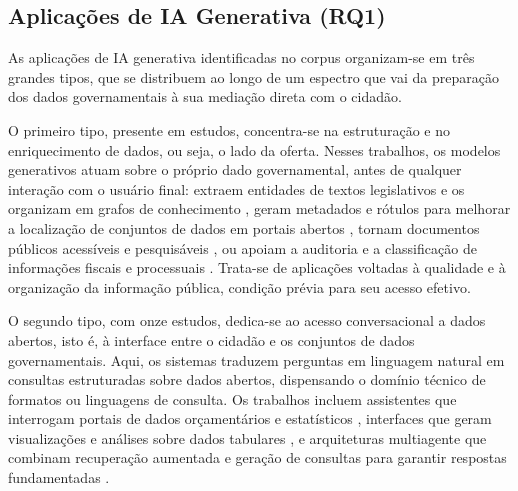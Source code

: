 \subsection{Aplicações de IA Generativa (RQ1)}
\label{subsec:rq1}

As aplicações de IA generativa identificadas no corpus organizam-se em três grandes tipos, que se distribuem ao longo de um espectro que vai da preparação dos dados governamentais à sua mediação direta com o cidadão.

O primeiro tipo, presente em  estudos, concentra-se na estruturação e no enriquecimento de dados, ou seja, o lado da oferta. Nesses trabalhos, os modelos generativos atuam sobre o próprio dado governamental, antes de qualquer interação com o usuário final: extraem entidades de textos legislativos e os organizam em grafos de conhecimento \citep{Colombo2025,Colombo2024}, geram metadados e rótulos para melhorar a localização de conjuntos de dados em portais abertos \citep{TAGIFY2025,Gan2026,GarciaMontero2026}, tornam documentos públicos acessíveis e pesquisáveis \citep{MakingPDFsAccessible2023}, ou apoiam a auditoria e a classificação de informações fiscais e processuais \citep{Monsalvo2025,Baron2023}\ifhl\mbox{\colorbox{yellow}{\citep{Fang2023}}}\else\citep{Fang2023}\fi. Trata-se de aplicações voltadas à qualidade e à organização da informação pública, condição prévia para seu acesso efetivo.

O segundo tipo, com onze estudos, dedica-se ao acesso conversacional a dados abertos, isto é, à interface entre o cidadão e os conjuntos de dados governamentais. Aqui, os sistemas traduzem perguntas em linguagem natural em consultas estruturadas sobre dados abertos, dispensando o domínio técnico de formatos ou linguagens de consulta. Os trabalhos incluem assistentes que interrogam portais de dados orçamentários e estatísticos \citep{ChatbotMadrid2021,ScotlandChatGPT2024,EffectiveUseOGD2025}, interfaces que geram visualizações e análises sobre dados tabulares \citep{ConversationalInterfaces2024,DesigningODAssistant2024}, e arquiteturas multiagente que combinam recuperação aumentada e geração de consultas para garantir respostas fundamentadas \citep{ExpertMultiAgent2025,HybridGraphRAG2025}.

